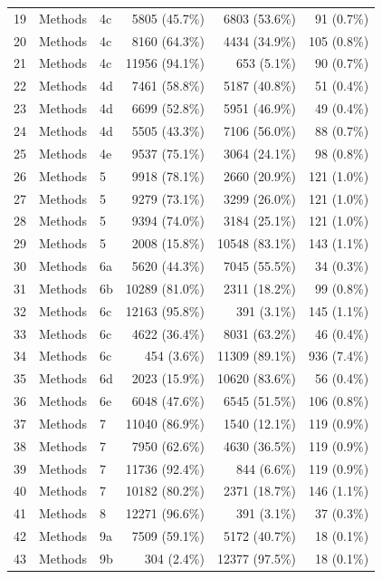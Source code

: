 \begin{longtable}{@{}rllrrr@{}}
19 & Methods & 4c & 5805 (45.7\%) & 6803 (53.6\%) & 91 (0.7\%) \\
20 & Methods & 4c & 8160 (64.3\%) & 4434 (34.9\%) & 105 (0.8\%) \\
21 & Methods & 4c & 11956 (94.1\%) & 653 (5.1\%) & 90 (0.7\%) \\
22 & Methods & 4d & 7461 (58.8\%) & 5187 (40.8\%) & 51 (0.4\%) \\
23 & Methods & 4d & 6699 (52.8\%) & 5951 (46.9\%) & 49 (0.4\%) \\
24 & Methods & 4d & 5505 (43.3\%) & 7106 (56.0\%) & 88 (0.7\%) \\
25 & Methods & 4e & 9537 (75.1\%) & 3064 (24.1\%) & 98 (0.8\%) \\
26 & Methods & 5 & 9918 (78.1\%) & 2660 (20.9\%) & 121 (1.0\%) \\
27 & Methods & 5 & 9279 (73.1\%) & 3299 (26.0\%) & 121 (1.0\%) \\
28 & Methods & 5 & 9394 (74.0\%) & 3184 (25.1\%) & 121 (1.0\%) \\
29 & Methods & 5 & 2008 (15.8\%) & 10548 (83.1\%) & 143 (1.1\%) \\
30 & Methods & 6a & 5620 (44.3\%) & 7045 (55.5\%) & 34 (0.3\%) \\
31 & Methods & 6b & 10289 (81.0\%) & 2311 (18.2\%) & 99 (0.8\%) \\
32 & Methods & 6c & 12163 (95.8\%) & 391 (3.1\%) & 145 (1.1\%) \\
33 & Methods & 6c & 4622 (36.4\%) & 8031 (63.2\%) & 46 (0.4\%) \\
34 & Methods & 6c & 454 (3.6\%) & 11309 (89.1\%) & 936 (7.4\%) \\
35 & Methods & 6d & 2023 (15.9\%) & 10620 (83.6\%) & 56 (0.4\%) \\
36 & Methods & 6e & 6048 (47.6\%) & 6545 (51.5\%) & 106 (0.8\%) \\
37 & Methods & 7 & 11040 (86.9\%) & 1540 (12.1\%) & 119 (0.9\%) \\
38 & Methods & 7 & 7950 (62.6\%) & 4630 (36.5\%) & 119 (0.9\%) \\
39 & Methods & 7 & 11736 (92.4\%) & 844 (6.6\%) & 119 (0.9\%) \\
40 & Methods & 7 & 10182 (80.2\%) & 2371 (18.7\%) & 146 (1.1\%) \\
41 & Methods & 8 & 12271 (96.6\%) & 391 (3.1\%) & 37 (0.3\%) \\
42 & Methods & 9a & 7509 (59.1\%) & 5172 (40.7\%) & 18 (0.1\%) \\
43 & Methods & 9b & 304 (2.4\%) & 12377 (97.5\%) & 18 (0.1\%) \\

\end{longtable}
